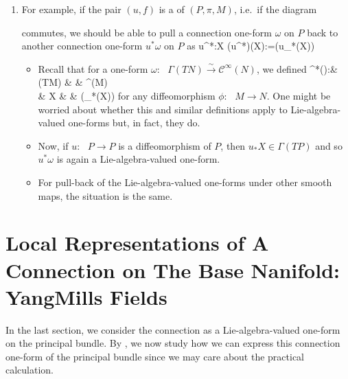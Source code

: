\documentclass{article}
\newcommand{\cl}{:\text{ }}
\begin{document}
\begin{enumerate}
\item {}
For example, if the pair $(u,f)$ is a  of $(P,\pi,M)$, i.e.\ if the diagram
\bse
{}
\ese
commutes, we should be able to pull a connection one-form $\omega$ on $P$ back to another connection one-form $u^*\omega$ on $P$ as 
\bse
u^*\omega\cl X \mapsto (u^*\omega)(X):=\omega(u_*(X))
\ese
\bse
{}
\ese
\begin{itemize}
    \item {\tiny Recall that for a one-form $\omega\cl \Gamma(TN)\xrightarrow{\sim}\mathcal{C}^\infty(N)$, we defined
\Phi^*(\omega)\cl & \Gamma(TM) & \xrightarrow{\sim} & ^\infty(M)\\
& X & \mapsto & \omega(\Phi_*(X))
\ei
for any diffeomorphism $\phi\cl M \to N$. One might be worried about whether this and similar definitions apply to Lie-algebra-valued one-forms but, in fact, they do.}
\item  Now, if $u\cl P\to P$ is a diffeomorphism of $P$, then $u_*X\in \Gamma(TP)$ and so 
$u^*\omega$ 
is again a Lie-algebra-valued one-form. 
\item For pull-back of the Lie-algebra-valued one-forms under other smooth maps, the situation is the same.
\end{itemize}

\end{enumerate}


\section{Local Representations of A Connection on The Base Nanifold: YangMills Fields}\label{sec:local_connection}
In the last section, we consider the connection as a Lie-algebra-valued one-form on the principal bundle. By , we  now study how we can express this connection one-form  of the principal bundle since we may care about the practical calculation.
\end{document}
